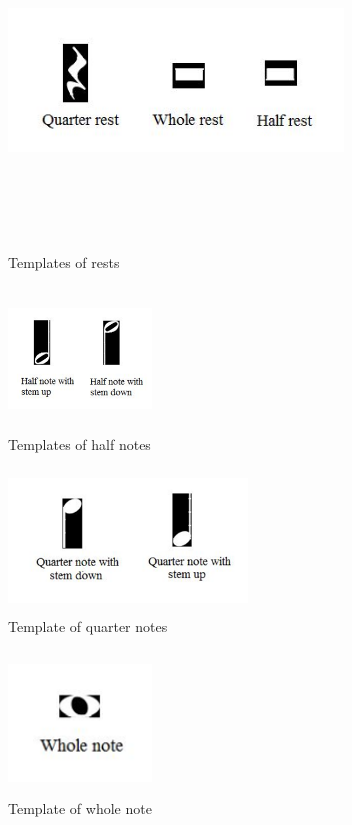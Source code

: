 \documentclass[journal]{IEEEtran}
\begin{document}
\begin{figure}
\includegraphics[width=3.5in,height=3.5in,clip,keepaspectratio]{resources/implementation/template_rest}
\centering
\caption{Templates of rests}
\end{figure}

\begin{figure}
\includegraphics[width=1.5in,height=1.5in,clip,keepaspectratio]{resources/implementation/template_half_note}
\centering
\caption{Templates of half notes}
\end{figure}

\begin{figure}
\includegraphics[width=2.5in,height=1.5in,clip,keepaspectratio]{resources/implementation/template_quarter_note}
\centering
\caption{Template of quarter notes}
\end{figure}

\begin{figure}
\includegraphics[width=1.5in,height=1.5in,clip,keepaspectratio]{resources/implementation/template_whole_note}
\centering
\caption{Template of whole note}
\end{figure}
\end{document}
